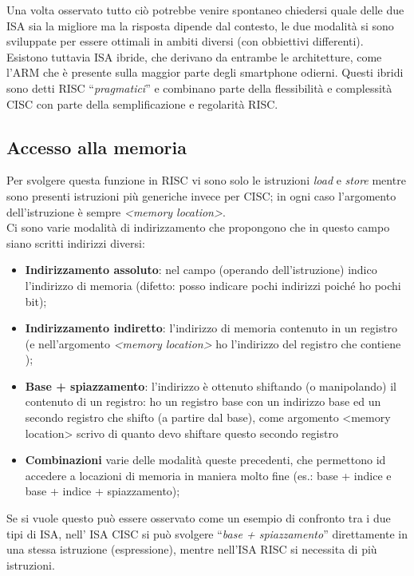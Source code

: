 Una volta osservato tutto ciò potrebbe venire spontaneo chiedersi quale delle due ISA sia la migliore ma la risposta dipende dal contesto, le due modalità si sono sviluppate per essere ottimali in ambiti diversi (con obbiettivi differenti).\\
Esistono tuttavia ISA ibride, che derivano da entrambe le architetture, come l’ARM che è presente sulla maggior parte degli smartphone odierni. Questi ibridi sono detti RISC “\textit{pragmatici}” e combinano parte della flessibilità e complessità  CISC con parte della semplificazione e regolarità RISC.

\subsection{Accesso alla memoria}
Per svolgere questa funzione in RISC vi sono solo le istruzioni \textit{load} e \textit{store} mentre sono presenti istruzioni più generiche invece per CISC; in ogni caso l’argomento dell’istruzione è sempre \textit{<memory location>}.\\
Ci sono varie modalità di indirizzamento che propongono che in questo campo siano scritti indirizzi diversi:
\begin{itemize}[noitemsep]
	\item \textbf{Indirizzamento assoluto}: nel campo (operando dell’istruzione)  indico l’indirizzo di memoria (difetto: posso indicare pochi indirizzi poiché ho pochi bit);
	\item \textbf{Indirizzamento indiretto}: l’indirizzo di memoria contenuto in un registro (e nell’argomento \textit{<memory location>} ho l’indirizzo del registro che contiene );
	\item \textbf{Base + spiazzamento}: l’indirizzo è ottenuto shiftando (o manipolando) il contenuto di un registro: ho un registro base con un indirizzo base ed un secondo registro che shifto (a partire dal base), come argomento <memory location> scrivo di quanto devo shiftare questo secondo registro
	\item \textbf{Combinazioni} varie delle modalità queste precedenti, che permettono id accedere a locazioni di memoria in maniera molto fine (es.: base + indice e base + indice + spiazzamento);
\end{itemize}

Se si vuole questo può essere osservato come un esempio di confronto tra i due tipi di ISA, nell’ ISA CISC si può svolgere “\textit{base + spiazzamento}” direttamente in una stessa istruzione (espressione), mentre nell'ISA RISC si necessita di più istruzioni.


